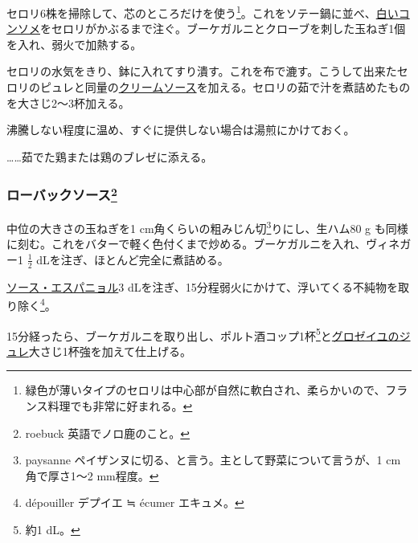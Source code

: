 \begin{recette}
セロリ6株を掃除して、芯のところだけを使う\footnote{緑色が薄いタイプのセロリは中心部が自然に軟白され、柔らかいので、フランス料理でも非常に好まれる。}。これをソテー鍋に並べ、\protect\hyperlink{}{白いコンソメ}をセロリがかぶるまで注ぐ。ブーケガルニとクローブを刺した玉ねぎ1個を入れ、弱火で加熱する。

セロリの水気をきり、鉢に入れてすり潰す。これを布で漉す。こうして出来たセロリのピュレと同量の\protect\hyperlink{cream-sauce}{クリームソース}を加える。セロリの茹で汁を煮詰めたものを大さじ2〜3杯加える。

沸騰しない程度に温め、すぐに提供しない場合は湯煎にかけておく。

\ldots{}\ldots{}茹でた鶏または鶏のブレゼに添える。

\hypertarget{roe-buck-sauce}{%
\subsubsection[ローバックソース]{\texorpdfstring{ローバックソース\footnote{roebuck
  英語でノロ鹿のこと。}}{ローバックソース}}\label{roe-buck-sauce}}



中位の大きさの玉ねぎを1 cm角くらいの粗みじん切\footnote{paysanne
  ペイザンヌに切る、と言う。主として野菜について言うが、1 cm角で厚さ1〜2
  mm程度。}りにし、生ハム80 g
も同様に刻む。これをバターで軽く色付くまで炒める。ブーケガルニを入れ、ヴィネガー1
\(\frac{1}{2}\) dLを注ぎ、ほとんど完全に煮詰める。

\protect\hyperlink{sauce-espagnole}{ソース・エスパニョル}3
dLを注ぎ、15分程弱火にかけて、浮いてくる不純物を取り除く\footnote{dépouiller
  デプイエ ≒ écumer エキュメ。}。

15分経ったら、ブーケガルニを取り出し、ポルト酒コップ1杯\footnote{約1
  dL。}と\protect\hyperlink{}{グロゼイユのジュレ}大さじ1杯強を加えて仕上げる。


\end{recette}
